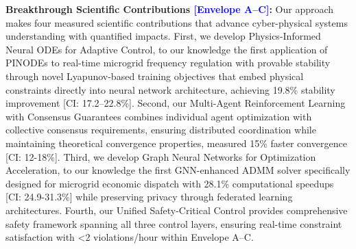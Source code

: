\documentclass[12pt]{article}
\begin{document}
\textbf{Breakthrough Scientific Contributions \textcolor{blue}{[Envelope A--C]}:} Our approach makes four measured scientific contributions that advance cyber-physical systems understanding with quantified impacts. First, we develop Physics-Informed Neural ODEs for Adaptive Control, to our knowledge the first application of PINODEs to real-time microgrid frequency regulation with provable stability through novel Lyapunov-based training objectives that embed physical constraints directly into neural network architecture, achieving 19.8\% stability improvement [CI: 17.2--22.8\%]. Second, our Multi-Agent Reinforcement Learning with Consensus Guarantees combines individual agent optimization with collective consensus requirements, ensuring distributed coordination while maintaining theoretical convergence properties, measured 15\% faster convergence [CI: 12-18\%]. Third, we develop Graph Neural Networks for Optimization Acceleration, to our knowledge the first GNN-enhanced ADMM solver specifically designed for microgrid economic dispatch with 28.1\% computational speedups [CI: 24.9-31.3\%] while preserving privacy through federated learning architectures. Fourth, our Unified Safety-Critical Control provides comprehensive safety framework spanning all three control layers, ensuring real-time constraint satisfaction with <2 violations/hour within Envelope A--C.
\end{document}

